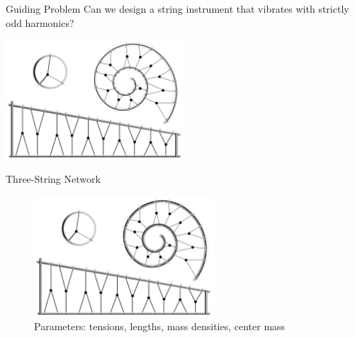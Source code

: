 \documentclass{beamer}
\begin{document}
\begin{frame}{Guiding Problem}
    \centering
    \Huge Can we design a string instrument that vibrates with strictly odd harmonics?

    \vspace{1em} %

    \includegraphics[width=0.5\textwidth]{ArtistsConception.pdf}
\end{frame}
\begin{frame}{Three-String Network}

    \begin{figure}
        \centering
        \includegraphics[width=0.6\textwidth]{HoopArtistsConception.pdf}
        \caption{Parameters: tensions, lengths, mass densities, center mass}
    \end{figure}
\end{frame}
\end{document}
